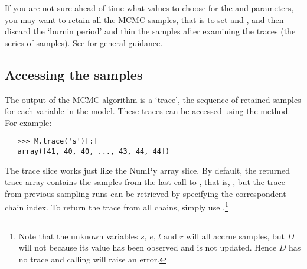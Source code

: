 If you are not sure ahead of time what values to choose for the  and  parameters, you may want to retain all the MCMC samples, that is to set  and , and then discard the `burnin period' and thin the samples after examining the traces (the series of samples). See \cite{gelman} for general guidance.  

\subsection{Accessing the samples}
The output of the MCMC algorithm is a `trace', the sequence of retained
samples for each variable in the model. These traces can be accessed
using the  method. For example:
\begin{verbatim}
   >>> M.trace('s')[:]
   array([41, 40, 40, ..., 43, 44, 44])
\end{verbatim}
The trace slice  works just like the NumPy array
slice. By default, the returned trace array contains the samples from the
last call to , that is, , but the trace from
previous sampling runs can be retrieved by specifying the correspondent 
chain index. To return the trace from all chains, simply use
.\footnote{Note that the unknown variables $s$, $e$, $l$ and $r$ will all
accrue samples, but $D$ will not because its value has been observed and is
not updated. Hence $D$ has no trace and calling  will
raise an error. }


